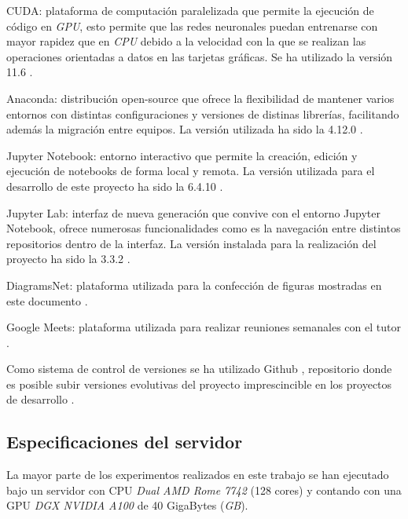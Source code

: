             \begin{description}

                \item CUDA: plataforma de computación paralelizada que permite la ejecución de código en \textit{GPU}, esto permite que las redes neuronales puedan entrenarse con mayor rapidez que en \textit{CPU} debido a la velocidad con la que se realizan las operaciones orientadas a datos en las tarjetas gráficas. Se ha utilizado la versión 11.6 \cite{CUDA}.

                \item Anaconda: distribución open-source que ofrece la flexibilidad de mantener varios entornos con distintas configuraciones y versiones de distinas librerías, facilitando además la migración entre equipos. La versión utilizada ha sido la 4.12.0 \cite{Anaconda}.

                \item Jupyter Notebook: entorno interactivo que permite la creación, edición y ejecución de notebooks de forma local y remota. La versión utilizada para el desarrollo de este proyecto ha sido la 6.4.10 \cite{JupyterNotebook}.

                \item Jupyter Lab: interfaz de nueva generación que convive con el entorno Jupyter Notebook, ofrece numerosas funcionalidades como es la navegación entre distintos repositorios dentro de la interfaz. La versión instalada para la realización del proyecto ha sido la 3.3.2 \cite{JupyterLab}.

                \item DiagramsNet: plataforma utilizada para la confección de figuras mostradas en este documento \cite{DiagramsNet}. 

                \item Google Meets: plataforma utilizada para realizar reuniones semanales con el tutor \cite{GoogleMeet}.

            \end{description}

            Como sistema de control de versiones se ha utilizado Github \cite{Github}, repositorio donde es posible subir versiones evolutivas del proyecto imprescincible en los proyectos de desarrollo \cite{Software}.

        \subsection{Especificaciones del servidor}
            La mayor parte de los experimentos realizados en este trabajo se han ejecutado bajo un servidor con CPU \textit{Dual AMD Rome 7742} (128 cores) y contando con una GPU \textit{DGX NVIDIA A100} de  40 GigaBytes (\textit{GB}).
            